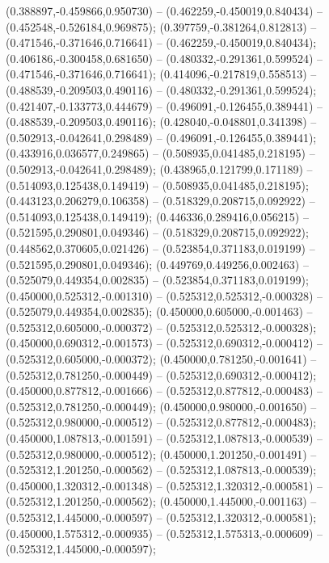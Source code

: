  (0.388897,-0.459866,0.950730) -- (0.462259,-0.450019,0.840434) -- (0.452548,-0.526184,0.969875);
 (0.397759,-0.381264,0.812813) -- (0.471546,-0.371646,0.716641) -- (0.462259,-0.450019,0.840434);
 (0.406186,-0.300458,0.681650) -- (0.480332,-0.291361,0.599524) -- (0.471546,-0.371646,0.716641);
 (0.414096,-0.217819,0.558513) -- (0.488539,-0.209503,0.490116) -- (0.480332,-0.291361,0.599524);
 (0.421407,-0.133773,0.444679) -- (0.496091,-0.126455,0.389441) -- (0.488539,-0.209503,0.490116);
 (0.428040,-0.048801,0.341398) -- (0.502913,-0.042641,0.298489) -- (0.496091,-0.126455,0.389441);
 (0.433916,0.036577,0.249865) -- (0.508935,0.041485,0.218195) -- (0.502913,-0.042641,0.298489);
 (0.438965,0.121799,0.171189) -- (0.514093,0.125438,0.149419) -- (0.508935,0.041485,0.218195);
 (0.443123,0.206279,0.106358) -- (0.518329,0.208715,0.092922) -- (0.514093,0.125438,0.149419);
 (0.446336,0.289416,0.056215) -- (0.521595,0.290801,0.049346) -- (0.518329,0.208715,0.092922);
 (0.448562,0.370605,0.021426) -- (0.523854,0.371183,0.019199) -- (0.521595,0.290801,0.049346);
 (0.449769,0.449256,0.002463) -- (0.525079,0.449354,0.002835) -- (0.523854,0.371183,0.019199);
 (0.450000,0.525312,-0.001310) -- (0.525312,0.525312,-0.000328) -- (0.525079,0.449354,0.002835);
 (0.450000,0.605000,-0.001463) -- (0.525312,0.605000,-0.000372) -- (0.525312,0.525312,-0.000328);
 (0.450000,0.690312,-0.001573) -- (0.525312,0.690312,-0.000412) -- (0.525312,0.605000,-0.000372);
 (0.450000,0.781250,-0.001641) -- (0.525312,0.781250,-0.000449) -- (0.525312,0.690312,-0.000412);
 (0.450000,0.877812,-0.001666) -- (0.525312,0.877812,-0.000483) -- (0.525312,0.781250,-0.000449);
 (0.450000,0.980000,-0.001650) -- (0.525312,0.980000,-0.000512) -- (0.525312,0.877812,-0.000483);
 (0.450000,1.087813,-0.001591) -- (0.525312,1.087813,-0.000539) -- (0.525312,0.980000,-0.000512);
 (0.450000,1.201250,-0.001491) -- (0.525312,1.201250,-0.000562) -- (0.525312,1.087813,-0.000539);
 (0.450000,1.320312,-0.001348) -- (0.525312,1.320312,-0.000581) -- (0.525312,1.201250,-0.000562);
 (0.450000,1.445000,-0.001163) -- (0.525312,1.445000,-0.000597) -- (0.525312,1.320312,-0.000581);
 (0.450000,1.575312,-0.000935) -- (0.525312,1.575313,-0.000609) -- (0.525312,1.445000,-0.000597);

